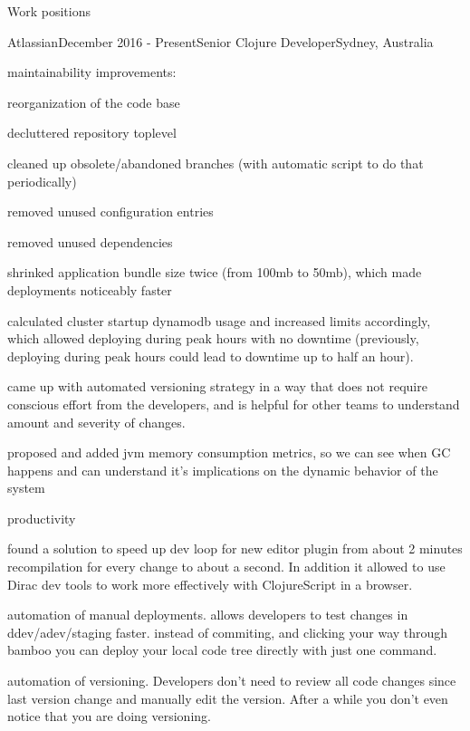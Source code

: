 \documentclass{resume} %
\begin{document}
\begin{rSection}{Work positions}
\begin{rSubsection}{Atlassian}{December 2016 - Present}{Senior Clojure Developer}{Sydney, Australia}
\item maintainability improvements:
  \begin{myList}
  \item reorganization of the code base
    \begin{myList}
    \item decluttered repository toplevel
    \item cleaned up obsolete/abandoned branches (with automatic script to do that periodically)
    \item removed unused configuration entries
    \item removed unused dependencies
    \end{myList}
  \item shrinked application bundle size twice (from 100mb to 50mb), which made deployments noticeably faster
  \item calculated cluster startup dynamodb usage and increased
    limits accordingly, which allowed deploying during peak hours
    with no downtime (previously, deploying during peak hours could
    lead to downtime up to half an hour).
  \item came up with automated versioning strategy in a way that does not require conscious effort from the developers, and is helpful for other teams to understand amount and severity of changes.
  \item proposed and added jvm memory consumption metrics, so we can see when GC happens and can understand it's implications on the dynamic behavior of the system
  \end{myList}
\item productivity
  \begin{myList}
  \item found a solution to speed up dev loop for new editor plugin
    from about 2 minutes recompilation for every change to about a
    second. In addition it allowed to use Dirac dev tools to work
    more effectively with ClojureScript in a browser.
  \item automation of manual deployments. allows developers to
    test changes in ddev/adev/staging faster. instead of commiting,
    and clicking your way through bamboo you can deploy your local
    code tree directly with just one command.
  \item automation of versioning. Developers don't need to review
    all code changes since last version change and manually edit the
    version. After a while you don't even notice that you are doing
    versioning.
  \end{myList}

\end{rSubsection}
\end{rSection}
\end{document}
